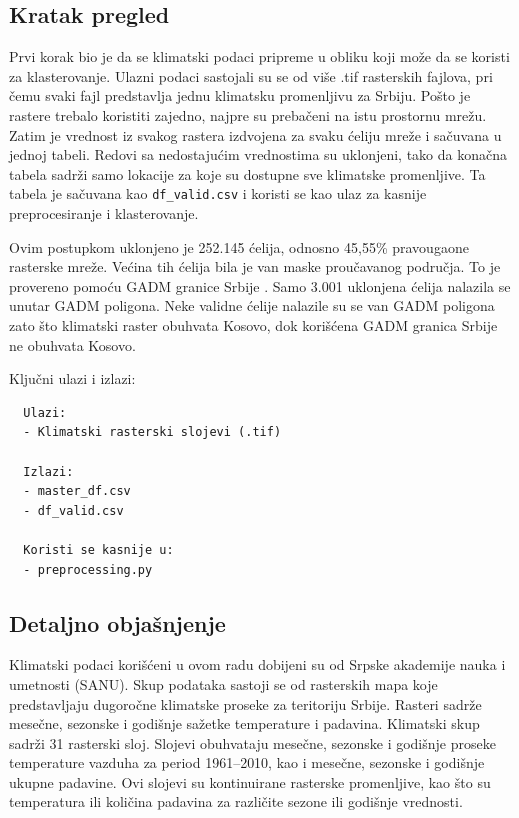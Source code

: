 \documentclass[11pt]{article}
\begin{document}
\subsection{Kratak pregled}
Prvi korak bio je da se klimatski podaci pripreme u obliku koji može da se koristi za klasterovanje. Ulazni podaci sastojali su se od više .tif rasterskih fajlova, pri čemu svaki fajl predstavlja jednu klimatsku promenljivu za Srbiju. Pošto je rastere trebalo koristiti zajedno, najpre su prebačeni na istu prostornu mrežu. Zatim je vrednost iz svakog rastera izdvojena za svaku ćeliju mreže i sačuvana u jednoj tabeli. Redovi sa nedostajućim vrednostima su uklonjeni, tako da konačna tabela sadrži samo lokacije za koje su dostupne sve klimatske promenljive. Ta tabela je sačuvana kao \texttt{df\_valid.csv} i koristi se kao ulaz za kasnije preprocesiranje i klasterovanje.

Ovim postupkom uklonjeno je 252.145 ćelija, odnosno 45,55\% pravougaone rasterske mreže. Većina tih ćelija bila je van maske proučavanog područja. To je provereno pomoću GADM granice Srbije \cite{gadm2022}. Samo 3.001 uklonjena ćelija nalazila se unutar GADM poligona. Neke validne ćelije nalazile su se van GADM poligona zato što klimatski raster obuhvata Kosovo, dok korišćena GADM granica Srbije ne obuhvata Kosovo.

Ključni ulazi i izlazi:
\begin{verbatim}
  Ulazi:
  - Klimatski rasterski slojevi (.tif)

  Izlazi:
  - master_df.csv
  - df_valid.csv

  Koristi se kasnije u:
  - preprocessing.py
\end{verbatim}

\subsection{Detaljno objašnjenje}
Klimatski podaci korišćeni u ovom radu dobijeni su od Srpske akademije nauka i umetnosti (SANU). Skup podataka sastoji se od rasterskih mapa koje predstavljaju dugoročne klimatske proseke za teritoriju Srbije. Rasteri sadrže mesečne, sezonske i godišnje sažetke temperature i padavina.
Klimatski skup sadrži 31 rasterski sloj. Slojevi obuhvataju mesečne, sezonske i godišnje proseke temperature vazduha za period 1961--2010, kao i mesečne, sezonske i godišnje ukupne padavine. Ovi slojevi su kontinuirane rasterske promenljive, kao što su temperatura ili količina padavina za različite sezone ili godišnje vrednosti.
\end{document}
